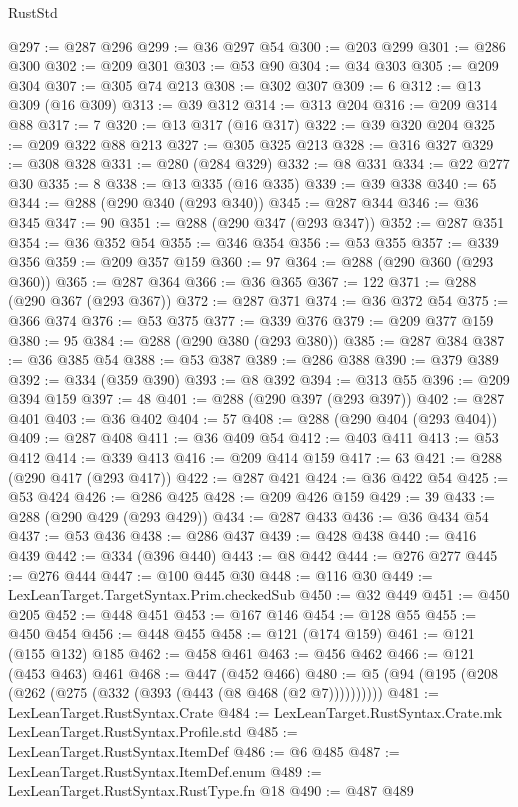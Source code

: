 \begin{lexlean}{RustStd}
\begin{coremodule}
@297 := @287 @296
@299 := @36 @297 @54
@300 := @203 @299
@301 := @286 @300
@302 := @209 @301
@303 := @53 @90
@304 := @34 @303
@305 := @209 @304
@307 := @305 @74 @213
@308 := @302 @307
@309 := 6
@312 := @13 @309 (@16 @309)
@313 := @39 @312
@314 := @313 @204
@316 := @209 @314 @88
@317 := 7
@320 := @13 @317 (@16 @317)
@322 := @39 @320 @204
@325 := @209 @322 @88 @213
@327 := @305 @325 @213
@328 := @316 @327
@329 := @308 @328
@331 := @280 (@284 @329)
@332 := @8 @331
@334 := @22 @277 @30
@335 := 8
@338 := @13 @335 (@16 @335)
@339 := @39 @338
@340 := 65
@344 := @288 (@290 @340 (@293 @340))
@345 := @287 @344
@346 := @36 @345
@347 := 90
@351 := @288 (@290 @347 (@293 @347))
@352 := @287 @351
@354 := @36 @352 @54
@355 := @346 @354
@356 := @53 @355
@357 := @339 @356
@359 := @209 @357 @159
@360 := 97
@364 := @288 (@290 @360 (@293 @360))
@365 := @287 @364
@366 := @36 @365
@367 := 122
@371 := @288 (@290 @367 (@293 @367))
@372 := @287 @371
@374 := @36 @372 @54
@375 := @366 @374
@376 := @53 @375
@377 := @339 @376
@379 := @209 @377 @159
@380 := 95
@384 := @288 (@290 @380 (@293 @380))
@385 := @287 @384
@387 := @36 @385 @54
@388 := @53 @387
@389 := @286 @388
@390 := @379 @389
@392 := @334 (@359 @390)
@393 := @8 @392
@394 := @313 @55
@396 := @209 @394 @159
@397 := 48
@401 := @288 (@290 @397 (@293 @397))
@402 := @287 @401
@403 := @36 @402
@404 := 57
@408 := @288 (@290 @404 (@293 @404))
@409 := @287 @408
@411 := @36 @409 @54
@412 := @403 @411
@413 := @53 @412
@414 := @339 @413
@416 := @209 @414 @159
@417 := 63
@421 := @288 (@290 @417 (@293 @417))
@422 := @287 @421
@424 := @36 @422 @54
@425 := @53 @424
@426 := @286 @425
@428 := @209 @426 @159
@429 := 39
@433 := @288 (@290 @429 (@293 @429))
@434 := @287 @433
@436 := @36 @434 @54
@437 := @53 @436
@438 := @286 @437
@439 := @428 @438
@440 := @416 @439
@442 := @334 (@396 @440)
@443 := @8 @442
@444 := @276 @277
@445 := @276 @444
@447 := @100 @445 @30
@448 := @116 @30
@449 := LexLeanTarget.TargetSyntax.Prim.checkedSub
@450 := @32 @449
@451 := @450 @205
@452 := @448 @451
@453 := @167 @146
@454 := @128 @55
@455 := @450 @454
@456 := @448 @455
@458 := @121 (@174 @159)
@461 := @121 (@155 @132) @185
@462 := @458 @461
@463 := @456 @462
@466 := @121 (@453 @463) @461
@468 := @447 (@452 @466)
@480 := @5 (@94 (@195 (@208 (@262 (@275 (@332 (@393 (@443 (@8 @468 (@2 @7))))))))))
@481 := LexLeanTarget.RustSyntax.Crate
@484 := LexLeanTarget.RustSyntax.Crate.mk LexLeanTarget.RustSyntax.Profile.std
@485 := LexLeanTarget.RustSyntax.ItemDef
@486 := @6 @485
@487 := LexLeanTarget.RustSyntax.ItemDef.enum
@489 := LexLeanTarget.RustSyntax.RustType.fn @18
@490 := @487 @489

\end{coremodule}
\end{lexlean}
